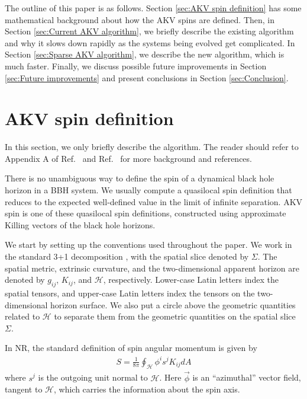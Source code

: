 \documentclass{iopjournal}
\begin{document}
The outline of this paper is as follows. Section \ref{sec:AKV spin definition} has some mathematical background about how the AKV spins are defined. Then, in Section \ref{sec:Current AKV algorithm}, we briefly describe the existing algorithm and why it slows down rapidly as the systems being evolved get complicated. In Section \ref{sec:Sparse AKV algorithm}, we describe the new algorithm, which is much faster. Finally, we discuss possible future improvements in Section \ref{sec:Future improvements} and present conclusions in Section \ref{sec:Conclusion}.

\section{\label{sec:AKV spin definition} AKV spin definition}
In this section, we only briefly describe the algorithm. The reader should refer to Appendix A of Ref.~\cite{lovelace_binary-black-hole_2008} and Ref.~\cite{Owen:2017yaj} for more background and references.

There is no unambiguous way to define the spin of a dynamical black hole horizon in a BBH system. We usually compute a quasilocal spin definition that reduces to the expected well-defined value in the limit of infinite separation. AKV spin is one of these quasilocal spin definitions, constructed using approximate Killing vectors of the black hole horizons.

We start by setting up the conventions used throughout the paper. We
work in the standard 3+1 decomposition
\cite{NR_Baumgarte,NR_shibata,NR_Alcubierre}, with the spatial slice
denoted by $\Sigma$. The spatial metric, extrinsic curvature, and the
two-dimensional apparent horizon are denoted by $g_{ij}$, $K_{ij}$,
and $\mathcal{H}$, respectively. Lower-case Latin letters index the
spatial tensors, and upper-case Latin letters index the tensors on the
two-dimensional horizon surface. We also put a circle above the geometric quantities related to $\mathcal{H}$ to separate them from the geometric quantities on the
spatial slice $\Sigma$.

In NR, the standard definition \cite{lovelace08_73} of spin angular momentum is given by 
\begin{align}
S=\frac{1}{8 \pi} \oint_{\mathcal{H}} \phi^i s^j K_{i j} d A
\label{eqn:spin angular momentum}
\end{align}
where  $s^j$ is the outgoing unit normal to $\mathcal{H}$. Here $\vec{\phi}$ is an ``azimuthal'' vector field, tangent to $\mathcal{H}$, which carries the information about the spin axis.
\end{document}
